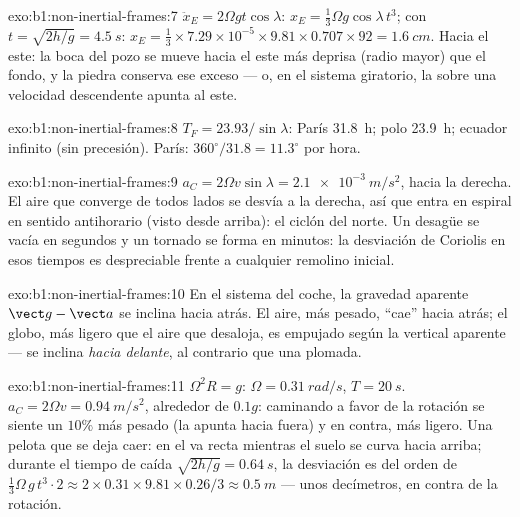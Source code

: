 \begin{solution}{exo:b1:non-inertial-frames:7}
$\ddot x_E = 2\Omega gt\cos\lambda$: $x_E = \tfrac13\Omega g\cos\lambda\,t^3$; con $t =
\sqrt{2h/g} = \qty{4.5}{s}$: $x_E = \tfrac13 \times 7.29\times10^{-5} \times 9.81
\times 0.707 \times 92 = \qty{1.6}{cm}$. Hacia el este: la boca del pozo se
mueve hacia el este más deprisa (radio mayor) que el fondo, y la piedra
conserva ese exceso --- o, en el sistema giratorio, la 
sobre una velocidad descendente apunta al este.
\end{solution}

\begin{solution}{exo:b1:non-inertial-frames:8}
$T_F = 23.93/\sin\lambda$: París \qty{31.8}{h}; polo \qty{23.9}{h}; ecuador
infinito (sin precesión). París: $360^\circ/31.8 = 11.3^\circ$ por hora.
\end{solution}

\begin{solution}{exo:b1:non-inertial-frames:9}
$a_C = 2\Omega v\sin\lambda = \qty{2.1e-3}{m/s^2}$, hacia la derecha. El aire
que converge de todos lados se desvía a la derecha, así que entra en
espiral en sentido antihorario (visto desde arriba): el ciclón del norte.
Un desagüe se vacía en segundos y un tornado se forma en minutos: la
desviación de Coriolis en esos tiempos es despreciable frente a cualquier
remolino inicial.
\end{solution}

\begin{solution}{exo:b1:non-inertial-frames:10}
En el sistema del coche, la gravedad aparente $\vect g - \vect a$ se
inclina hacia atrás. El aire, más pesado, ``cae'' hacia atrás; el globo,
más ligero que el aire que desaloja, es empujado según la vertical
aparente --- se inclina \emph{hacia delante}, al contrario que una plomada.
\end{solution}

\begin{solution}{exo:b1:non-inertial-frames:11}
$\Omega^2R = g$: $\Omega = \qty{0.31}{rad/s}$, $T = \qty{20}{s}$. $a_C = 2\Omega v
= \qty{0.94}{m/s^2}$, alrededor de $0.1g$: caminando a favor de la
rotación se siente un $10\%$ más pesado (la  apunta
hacia fuera) y en contra, más ligero. Una pelota que se deja caer: en el
 va recta mientras el suelo se curva hacia arriba; durante
el tiempo de caída $\sqrt{2h/g} = \qty{0.64}{s}$, la desviación es del
orden de $\tfrac13\Omega\,g\,t^3 \cdot 2 \approx 2 \times 0.31 \times
9.81 \times 0.26/3 \approx \qty{0.5}{m}$ --- unos decímetros, en contra de
la rotación.
\end{solution}

